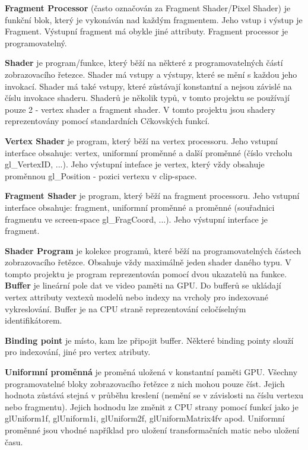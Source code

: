 {\bfseries Fragment Processor} (často označován za Fragment Shader/\+Pixel Shader) je funkční blok, který je vykonáván nad každým fragmentem. Jeho vstup i výstup je Fragment. Výstupní fragment má obykle jiné attributy. Fragment processor je programovatelný.

{\bfseries Shader} je program/funkce, který běží na některé z programovatelných částí zobrazovacího řetezce. Shader má vstupy a výstupy, které se mění s každou jeho invokací. Shader má také vstupy, které zůstávají konstantní a nejsou závislé na číslu invokace shaderu. Shaderů je několik typů, v tomto projektu se používají pouze 2 -\/ vertex shader a fragment shader. V tomto projektu jsou shadery reprezentovány pomocí standardních Cčkovských funkcí.

{\bfseries Vertex Shader} je program, který běží na vertex processoru. Jeho vstupní interface obsahuje\+: vertex, uniformní proměnné a další proměnné (číslo vrcholu gl\+\_\+\+Vertex\+I\+D, ...). Jeho výstupní inteface je vertex, který vždy obsahuje proměnnou gl\+\_\+\+Position -\/ pozici vertexu v clip-\/space.

{\bfseries Fragment Shader} je program, který běží na fragment processoru. Jeho vstupní interface obsahuje\+: fragment, uniformní proměnné a proměnné (souřadnici fragmentu ve screen-\/space gl\+\_\+\+Frag\+Coord, ...). Jeho výstupní interface je fragment.

{\bfseries Shader Program} je kolekce programů, které běží na programovatelných částech zobrazovacího řetězce. Obsahuje vždy maximálně jeden shader daného typu. V tompto projektu je program reprezentován pomocí dvou ukazatelů na funkce.  {\bfseries Buffer} je lineární pole dat ve video paměti na G\+P\+U. Do bufferů se ukládají vertex attributy vextexů modelů nebo indexy na vrcholy pro indexované vykreslování. Buffer je na C\+P\+U straně reprezentování celočíselným identifikátorem.

{\bfseries Binding point} je místo, kam lze připojit buffer. Některé binding pointy slouží pro indexování, jiné pro vertex atributy.

{\bfseries Uniformní proměnná} je proměná uložená v konstantní paměti G\+P\+U. Všechny programovatelné bloky zobrazovacího řetězce z nich mohou pouze číst. Jejich hodnota zůstává stejná v průběhu kreslení (nemění se v závislosti na číslu vertexu nebo fragmentu). Jejich hodnodu lze změnit z C\+P\+U strany pomocí funkcí jako je gl\+Uniform1f, gl\+Uniform1i, gl\+Uniform2f, gl\+Uniform\+Matrix4fv apod. Uniformní proměnné jsou vhodné například pro uložení transformačních matic nebo uložení času.

